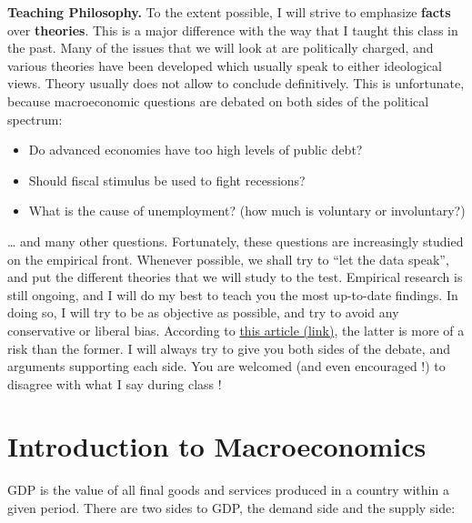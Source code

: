 \documentclass[]{book}
\providecommand{\tightlist}{%
  \setlength{\itemsep}{0pt}\setlength{\parskip}{0pt}}
\theoremstyle{definition}
\theoremstyle{definition}
\theoremstyle{definition}
\theoremstyle{remark}
\begin{document}
\textbf{Teaching Philosophy.} To the extent possible, I will strive to
emphasize \textbf{facts} over \textbf{theories}. This is a major
difference with the way that I taught this class in the past. Many of
the issues that we will look at are politically charged, and various
theories have been developed which usually speak to either ideological
views. Theory usually does not allow to conclude definitively. This is
unfortunate, because macroeconomic questions are debated on both sides
of the political spectrum:

\begin{itemize}
\tightlist
\item
  Do advanced economies have too high levels of public debt?
\item
  Should fiscal stimulus be used to fight recessions?
\item
  What is the cause of unemployment? (how much is voluntary or
  involuntary?)
\end{itemize}

\ldots{} and many other questions. Fortunately, these questions are
increasingly studied on the empirical front. Whenever possible, we shall
try to ``let the data speak'', and put the different theories that we
will study to the test. Empirical research is still ongoing, and I will
do my best to teach you the most up-to-date findings. In doing so, I
will try to be as objective as possible, and try to avoid any
conservative or liberal bias. According to
\href{https://www.bloomberg.com/view/articles/2018-09-17/colleges-have-way-too-many-liberal-professors}{this
article (link)}, the latter is more of a risk than the former. I will
always try to give you both sides of the debate, and arguments
supporting each side. You are welcomed (and even encouraged !) to
disagree with what I say during class !

\hypertarget{intro-cobb}{\chapter{Introduction to
Macroeconomics}\label{intro-cobb}}

GDP is the value of all final goods and services produced in a country
within a given period. There are two sides to GDP, the demand side and
the supply side:
\end{document}
